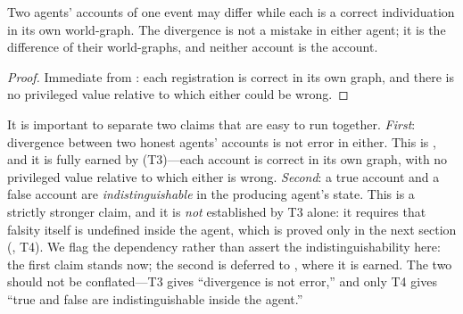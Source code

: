 \documentclass[11pt,twocolumn,a4paper]{article}
\begin{document}
\begin{corollary}
\label{cor:divergence}
Two agents' accounts of one event may differ while each is a correct
individuation in its own world-graph. The divergence is not a mistake in
either agent; it is the difference of their world-graphs, and neither
account is the account.
\end{corollary}

\begin{proof}
Immediate from : each registration is correct in its
own graph, and there is no privileged value relative to which either could
be wrong.
\end{proof}

\begin{remark}
\label{rem:honestdiv}
It is important to separate two claims that are easy to run together.
\emph{First}: divergence between two honest agents' accounts is not error in
either. This is , and it is fully earned by
 (T3)---each account is correct in its own graph, with
no privileged value relative to which either is wrong. \emph{Second}: a true
account and a false account are \emph{indistinguishable} in the producing
agent's state. This is a strictly stronger claim, and it is \emph{not}
established by T3 alone: it requires that falsity itself is undefined inside
the agent, which is proved only in the next section
(, T4). We flag the dependency rather than assert
the indistinguishability here: the first claim stands now; the second is
deferred to , where it is earned. The two should not be
conflated---T3 gives ``divergence is not error,'' and only T4 gives ``true
and false are indistinguishable inside the agent.''
\end{remark}
\end{document}
